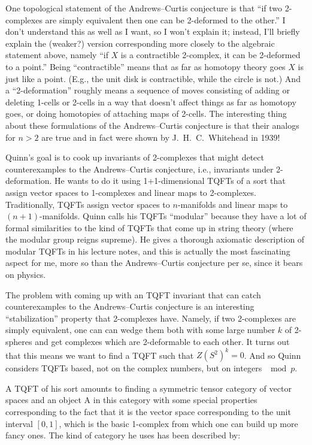\documentclass[12pt]{article}
\begin{document}
One topological statement of the Andrews--Curtis conjecture is that ``if
two 2-complexes are simply equivalent then one can be 2-deformed to the
other.'' I don't understand this as well as I want, so I won't explain
it; instead, I'll briefly explain the (weaker?) version corresponding
more closely to the algebraic statement above, namely ``if \(X\) is a
contractible 2-complex, it can be 2-deformed to a point.'' Being
``contractible'' means that as far as homotopy theory goes \(X\) is just
like a point. (E.g., the unit disk is contractible, while the circle is
not.) And a ``2-deformation'' roughly means a sequence of moves
consisting of adding or deleting 1-cells or 2-cells in a way that
doesn't affect things as far as homotopy goes, or doing homotopies of
attaching maps of 2-cells. The interesting thing about these
formulations of the Andrews--Curtis conjecture is that their analogs for
\(n > 2\) are true and in fact were shown by J.\ H.\ C.\ Whitehead in 1939!

Quinn's goal is to cook up invariants of 2-complexes that might detect
counterexamples to the Andrews--Curtis conjecture, i.e., invariants under
2-deformation. He wants to do it using 1+1-dimensional TQFTs of a sort
that assign vector spaces to 1-complexes and linear maps to 2-complexes.
Traditionally, TQFTs assign vector spaces to \(n\)-manifolds and linear
maps to \((n+1)\)-manifolds. Quinn calls his TQFTs ``modular'' because
they have a lot of formal similarities to the kind of TQFTs that come up
in string theory (where the modular group reigns supreme). He gives a
thorough axiomatic description of modular TQFTs in his lecture notes,
and this is actually the most fascinating aspect for me, more so than
the Andrews--Curtis conjecture per se, since it bears on physics.

The problem with coming up with an TQFT invariant that can catch
counterexamples to the Andrews--Curtis conjecture is an interesting
``stabilization'' property that 2-complexes have. Namely, if two
2-complexes are simply equivalent, one can can wedge them both with some
large number \(k\) of 2-spheres and get complexes which are 2-deformable
to each other. It turns out that this means we want to find a TQFT such
that \(Z(S^2)^k = 0\). And so Quinn considers TQFTs based, not on the
complex numbers, but on integers \(\mod p\).

A TQFT of his sort amounts to finding a symmetric tensor category of
vector spaces and an object A in this category with some special
properties corresponding to the fact that it is the vector space
corresponding to the unit interval \([0,1]\), which is the basic
1-complex from which one can build up more fancy ones. The kind of
category he uses has been described by:
\end{document}
